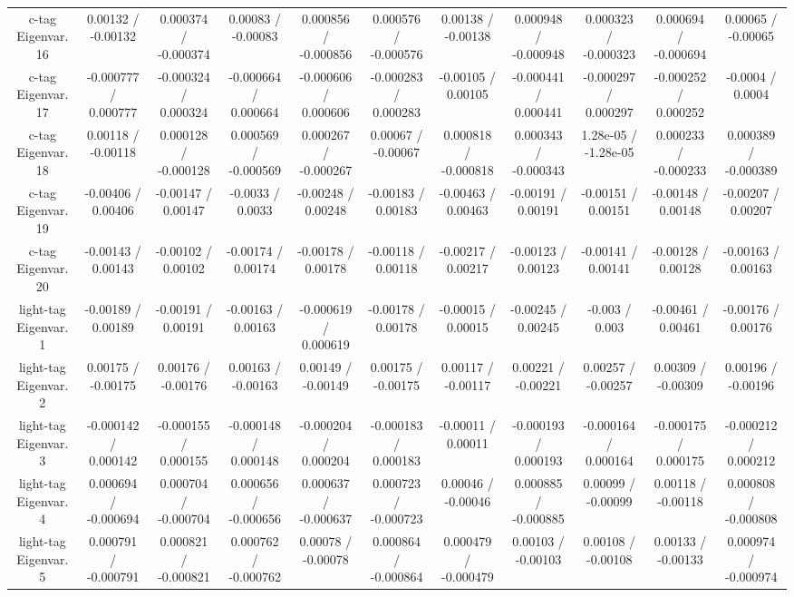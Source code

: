 \begin{table}[htbp]
\begin{center}
\begin{tabular}{|c|c|c|c|c|c|c|c|c|c|c|}
  c-tag Eigenvar. 16 & 0.00132 / -0.00132 & 0.000374 / -0.000374 & 0.00083 / -0.00083 & 0.000856 / -0.000856 & 0.000576 / -0.000576 & 0.00138 / -0.00138 & 0.000948 / -0.000948 & 0.000323 / -0.000323 & 0.000694 / -0.000694 & 0.00065 / -0.00065 \\ 
  c-tag Eigenvar. 17 & -0.000777 / 0.000777 & -0.000324 / 0.000324 & -0.000664 / 0.000664 & -0.000606 / 0.000606 & -0.000283 / 0.000283 & -0.00105 / 0.00105 & -0.000441 / 0.000441 & -0.000297 / 0.000297 & -0.000252 / 0.000252 & -0.0004 / 0.0004 \\ 
  c-tag Eigenvar. 18 & 0.00118 / -0.00118 & 0.000128 / -0.000128 & 0.000569 / -0.000569 & 0.000267 / -0.000267 & 0.00067 / -0.00067 & 0.000818 / -0.000818 & 0.000343 / -0.000343 & 1.28e-05 / -1.28e-05 & 0.000233 / -0.000233 & 0.000389 / -0.000389 \\ 
  c-tag Eigenvar. 19 & -0.00406 / 0.00406 & -0.00147 / 0.00147 & -0.0033 / 0.0033 & -0.00248 / 0.00248 & -0.00183 / 0.00183 & -0.00463 / 0.00463 & -0.00191 / 0.00191 & -0.00151 / 0.00151 & -0.00148 / 0.00148 & -0.00207 / 0.00207 \\ 
  c-tag Eigenvar. 20 & -0.00143 / 0.00143 & -0.00102 / 0.00102 & -0.00174 / 0.00174 & -0.00178 / 0.00178 & -0.00118 / 0.00118 & -0.00217 / 0.00217 & -0.00123 / 0.00123 & -0.00141 / 0.00141 & -0.00128 / 0.00128 & -0.00163 / 0.00163 \\ 
  light-tag Eigenvar. 1 & -0.00189 / 0.00189 & -0.00191 / 0.00191 & -0.00163 / 0.00163 & -0.000619 / 0.000619 & -0.00178 / 0.00178 & -0.00015 / 0.00015 & -0.00245 / 0.00245 & -0.003 / 0.003 & -0.00461 / 0.00461 & -0.00176 / 0.00176 \\ 
  light-tag Eigenvar. 2 & 0.00175 / -0.00175 & 0.00176 / -0.00176 & 0.00163 / -0.00163 & 0.00149 / -0.00149 & 0.00175 / -0.00175 & 0.00117 / -0.00117 & 0.00221 / -0.00221 & 0.00257 / -0.00257 & 0.00309 / -0.00309 & 0.00196 / -0.00196 \\ 
  light-tag Eigenvar. 3 & -0.000142 / 0.000142 & -0.000155 / 0.000155 & -0.000148 / 0.000148 & -0.000204 / 0.000204 & -0.000183 / 0.000183 & -0.00011 / 0.00011 & -0.000193 / 0.000193 & -0.000164 / 0.000164 & -0.000175 / 0.000175 & -0.000212 / 0.000212 \\ 
  light-tag Eigenvar. 4 & 0.000694 / -0.000694 & 0.000704 / -0.000704 & 0.000656 / -0.000656 & 0.000637 / -0.000637 & 0.000723 / -0.000723 & 0.00046 / -0.00046 & 0.000885 / -0.000885 & 0.00099 / -0.00099 & 0.00118 / -0.00118 & 0.000808 / -0.000808 \\ 
  light-tag Eigenvar. 5 & 0.000791 / -0.000791 & 0.000821 / -0.000821 & 0.000762 / -0.000762 & 0.00078 / -0.00078 & 0.000864 / -0.000864 & 0.000479 / -0.000479 & 0.00103 / -0.00103 & 0.00108 / -0.00108 & 0.00133 / -0.00133 & 0.000974 / -0.000974 \\ 

\end{tabular}
\end{center}
\end{table}
